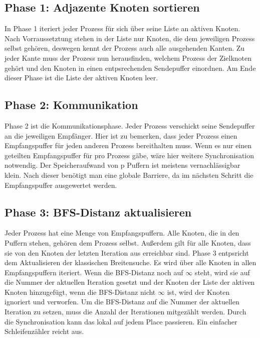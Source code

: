\subsection{Phase 1: Adjazente Knoten sortieren} %
\label{sub:phase_1}
In Phase 1 iteriert jeder Prozess für sich über seine Liste an aktiven Knoten. Nach Vorraussetztung stehen in der Liste nur Knoten, die dem jeweiligen Prozess selbst gehören, deswegen kennt der Prozess auch alle ausgehenden Kanten. Zu jeder Kante muss der Prozess nun herausfinden, welchem Prozess der Zielknoten gehört und den Knoten in einen entpsrechenden Sendepuffer einordnen. Am Ende dieser Phase ist die Liste der aktiven Knoten leer.

\subsection{Phase 2: Kommunikation} %
\label{sub:phase_2}
Phase 2 ist die Kommunikationsphase. Jeder Prozess verschickt seine Sendepuffer an die jeweiligen Empfänger. Hier ist zu bemerken, dass jeder Prozess einen Empfangspuffer für jeden anderen Prozess bereithalten muss. Wenn es nur einen geteilten Empfangspuffer für pro Prozess gäbe, wäre hier weitere Synchronisation notwendig. Der Speicheraufwand von p Puffern ist meistens vernachlässigbar klein. Nach dieser benötigt man eine globale Barriere, da im nächsten Schritt die Empfangspuffer ausgewertet werden.

\subsection{Phase 3: BFS-Distanz aktualisieren} %
\label{sub:phase_3}
Jeder Prozess hat eine Menge von Empfangspuffern. Alle Knoten, die in den Puffern stehen, gehören dem Prozess selbst. Außerdem gilt für alle Knoten, dass sie von den Knoten der letzten Iteration aus erreichbar sind. Phase 3 entpsricht dem Aktualisieren der klassischen Breitensuche. Es wird über alle Knoten in allen Empfangspuffern iteriert. Wenn die BFS-Distanz noch auf $\infty$ steht, wird sie auf die Nummer der aktuellen Iteration gesetzt und der Knoten der Liste der aktiven Knoten hinzugefügt, wenn die BFS-Distanz nicht $\infty$ ist, wird der Knoten ignoriert und verworfen. 
Um die BFS-Distanz auf die Nummer der aktuellen Iteration zu setzen, muss die Anzahl der Iterationen mitgezählt werden. Durch die Synchronisation kann das lokal auf jedem Place passieren. Ein einfacher Schleifenzähler reicht aus.

